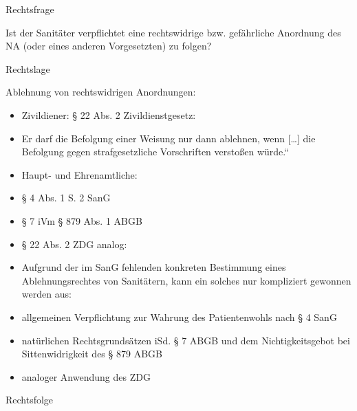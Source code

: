 \documentclass{article}
\begin{document}
Rechtsfrage

Ist der Sanit\"ater verpflichtet eine rechtswidrige bzw. gef\"ahrliche
Anordnung des NA (oder eines anderen Vorgesetzten) zu folgen?

Rechtslage

Ablehnung von rechtswidrigen Anordnungen:

\begin{itemize}
\item Zivildiener: {\S} 22 Abs. 2 Zivildienstgesetz:

\end{itemize}
\begin{itemize}
\item[] {\quotedblbase}Er darf die Befolgung einer Weisung nur dann
ablehnen, wenn [{\dots}] die Befolgung gegen strafgesetzliche
Vorschriften versto{\ss}en w\"urde.{\textquotedblleft}

\end{itemize}
\begin{itemize}
\item Haupt- und Ehrenamtliche: 

\end{itemize}
\begin{itemize}
\item {\S} 4 Abs. 1 S. 2 SanG

\item {\S} 7 iVm {\S} 879 Abs. 1 ABGB

\item {\S} 22 Abs. 2 ZDG analog:

\end{itemize}
\begin{itemize}
\item[] Aufgrund der im SanG fehlenden konkreten Bestimmung eines
Ablehnungsrechtes von Sanit\"atern, kann ein solches nur kompliziert
gewonnen werden aus:

\end{itemize}
\begin{itemize}
\item allgemeinen Verpflichtung zur Wahrung des Patientenwohls nach {\S}
4 SanG

\item nat\"urlichen Rechtsgrunds\"atzen iSd. {\S} 7 ABGB und dem
Nichtigkeitsgebot bei Sittenwidrigkeit des {\S} 879 ABGB

\item analoger Anwendung des ZDG 

\end{itemize}
Rechtsfolge
\end{document}
